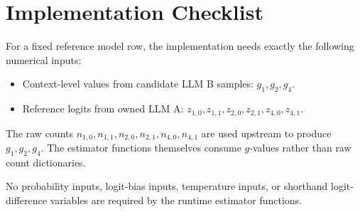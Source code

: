 \documentclass[11pt]{article}
\begin{document}
\section{Implementation Checklist}

For a fixed reference model row, the implementation needs exactly the following numerical inputs:

\begin{itemize}[leftmargin=*]
    \item Context-level values from candidate LLM B samples: \(g_1,g_2,g_4\).
    \item Reference logits from owned LLM A: \(z_{1,0}, z_{1,1}, z_{2,0}, z_{2,1}, z_{4,0}, z_{4,1}\).
\end{itemize}

The raw counts \(n_{1,0}, n_{1,1}, n_{2,0}, n_{2,1}, n_{4,0}, n_{4,1}\) are used upstream to produce \(g_1,g_2,g_4\). The estimator functions themselves consume \(g\)-values rather than raw count dictionaries.

No probability inputs, logit-bias inputs, temperature inputs, or shorthand logit-difference variables are required by the runtime estimator functions.
\end{document}
